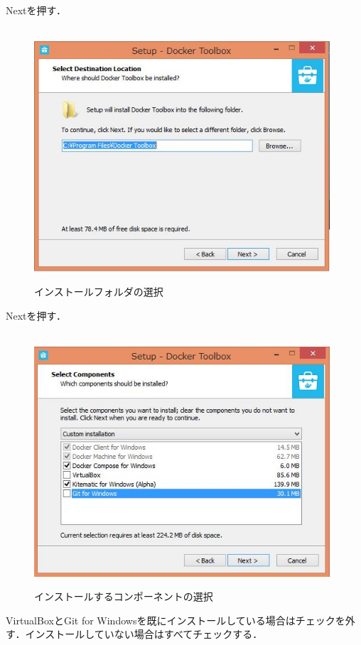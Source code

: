 Nextを押す．

\newpage

\begin{figure}[htb]
\centering　
\includegraphics[width=11cm]{4.JPG}
\caption{インストールフォルダの選択}\label{tab:uac}
\end{figure}
Nextを押す．
\newpage

\begin{figure}[htb]
\centering　
\includegraphics[width=11cm]{5.JPG}
\caption{インストールするコンポーネントの選択}\label{tab:uac}
\end{figure}
VirtualBoxとGit for Windowsを既にインストールしている場合はチェックを外す．インストールしていない場合はすべてチェックする．
\newpage

